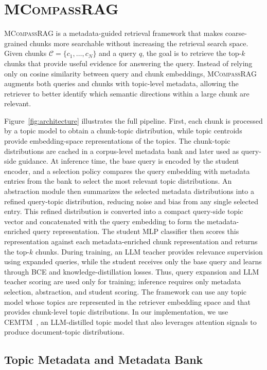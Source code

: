\documentclass{llmxive}
\providecommand{\name}[1]{\textsc{MCompassRAG}\xspace}
\begin{document}
\section{\name{}}

\name{} is a metadata-guided retrieval framework that makes coarse-grained chunks more searchable without increasing the retrieval search space. Given chunks $\mathcal{C}=\{c_1,\ldots,c_N\}$ and a query $q$, the goal is to retrieve the top-$k$ chunks that provide useful evidence for answering the query. Instead of relying only on cosine similarity between query and chunk embeddings, \name{} augments both queries and chunks with topic-level metadata, allowing the retriever to better identify which semantic directions within a large chunk are relevant.

Figure~\ref{fig:architecture} illustrates the full pipeline. First, each chunk is processed by a topic model to obtain a chunk-topic distribution, while topic centroids provide embedding-space representations of the topics. The chunk-topic distributions are cached in a corpus-level metadata bank and later used as query-side guidance. At inference time, the base query is encoded by the student encoder, and a selection policy compares the query embedding with metadata entries from the bank to select the most relevant topic distributions. An abstraction module then summarizes the selected metadata distributions into a refined query-topic distribution, reducing noise and bias from any single selected entry. This refined distribution is converted into a compact query-side topic vector and concatenated with the query embedding to form the metadata-enriched query representation. The student MLP classifier then scores this representation against each metadata-enriched chunk representation and returns the top-$k$ chunks. During training, an LLM teacher provides relevance supervision using expanded queries, while the student receives only the base query and learns through BCE and knowledge-distillation losses. Thus, query expansion and LLM teacher scoring are used only for training; inference requires only metadata selection, abstraction, and student scoring. The framework can use any topic model whose topics are represented in the retriever embedding space and that provides chunk-level topic distributions. In our implementation, we use CEMTM~\cite{abaskohi-etal-2025-cemtm}, an LLM-distilled topic model that also leverages attention signals to produce document-topic distributions.

\subsection{Topic Metadata and Metadata Bank}
\label{sec:metadata_bank}
\end{document}
